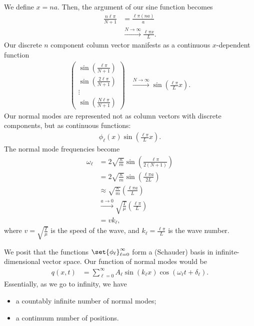\documentclass[10pt]{mypackage}
\begin{document}
We define $x = na$. Then, the argument of our sine function becomes
\begin{align*}
  \frac{n\ell \pi}{N+1} &= \frac{\ell \pi \left(na\right)}{a}\\
                        &\xrightarrow{N\rightarrow\infty} \frac{\ell \pi x}{L}.
\end{align*}
Our discrete $n$ component column vector manifests as a continuous $x$-dependent function
{\renewcommand{\arraystretch}{1.5}
  \begin{align*}
    \begin{pmatrix}\sin \left(\frac{\ell \pi}{N+1}\right) \\ \sin\left(\frac{2\ell \pi}{N+1}\right) \\\vdots \\ \sin\left(\frac{N\ell \pi}{N+1}\right) \end{pmatrix} & \xrightarrow{N\rightarrow\infty} \sin\left(\frac{\ell \pi}{L} x\right).
\end{align*}
}
Our normal modes are represented not as column vectors with discrete components, but as continuous functions:
\begin{align*}
  \phi_{\ell}\left(x\right)  \sin\left(\frac{\ell \pi}{L}x\right).
\end{align*}
The normal mode frequencies become
\begin{align*}
  \omega_{\ell} &= 2\sqrt{\frac{\kappa}{m}} \sin\left(\frac{\ell \pi}{2\left(N+1\right)}\right)\\
                &= 2\sqrt{\frac{\kappa}{m}} \sin\left(\frac{\ell \pi a}{2L}\right)\\
                &\approx \sqrt{\frac{\kappa}{m}}\left(\frac{\ell \pi a}{L}\right)\\
                &\xrightarrow{a\rightarrow 0} \sqrt{\frac{T}{\mu}} \left(\frac{\ell \pi}{L}\right)\\
                &= v k_{\ell},
\end{align*}
where $v = \sqrt{\frac{T}{\mu}}$ is the speed of the wave, and $k_{\ell} = \frac{\ell \pi}{L}$ is the wave number.\newline

We posit that the functions $\set{\phi_{\ell}}_{\ell = 0}^{\infty}$ form a (Schauder) basis in infinite-dimensional vector space. Our function of normal modes would be
\begin{align*}
  q\left(x,t\right) &= \sum_{\ell = 0}^{\infty}A_{\ell}\sin\left(k_{\ell}x\right)\cos\left(\omega_{\ell}t + \delta_{\ell}\right).
\end{align*}
Essentially, as we go to infinity, we have
\begin{itemize}
  \item a countably infinite number of normal modes;
  \item a continuum number of positions.
\end{itemize}
\end{document}
